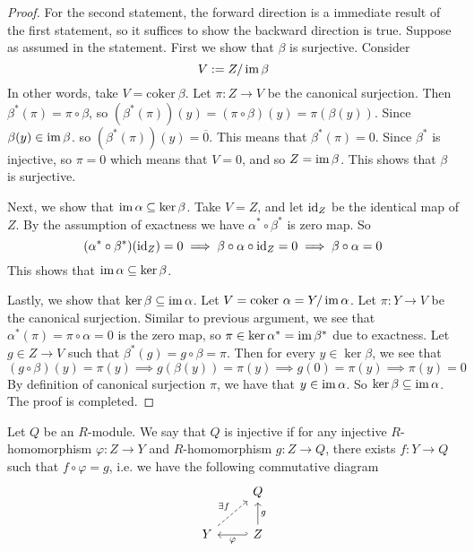 \begin{proof}
    For the second statement, the forward direction is a immediate result of the first statement, so it suffices to show the backward direction is true. Suppose as assumed in the statement. First we show that $\beta$ is surjective. Consider 
    \[V := Z/\operatorname{im} \beta\]
    In other words, take $V= \text{coker}\ \beta$. Let $\pi:Z\to V$ be the canonical surjection. Then $\beta^*(\pi) = \pi\circ \beta$, so $(\beta^*(\pi))(y) = (\pi\circ \beta)(y) = \pi(\beta(y))$. Since $\beta(y)\in \operatorname{im} \beta$. so $(\beta^*(\pi))(y) = \overline{0}$. This means that $\beta^*(\pi)=0$. Since $\beta^*$ is injective, so $\pi=0$ which means that $V=0$, and so $Z = \operatorname{im} \beta$. This shows that $\beta$ is surjective.
    
    Next, we show that $\operatorname{im}\alpha \subseteq \ker \beta$. Take $V=Z$, and let $\operatorname{id}_Z$ be the identical map of $Z$. By the assumption of exactness we have $\alpha^*\circ \beta^*$ is zero map. So
    \[(\alpha^* \circ \beta^*)(\operatorname{id}_Z) = 0 \implies \beta\circ \alpha \circ \operatorname{id}_Z = 0\implies \beta\circ \alpha = 0\]
    This shows that $\operatorname{im} \alpha\subseteq \ker \beta$.

    Lastly, we show that $\ker\beta\subseteq \operatorname{im} \alpha$. Let $V=\text{coker}\ \alpha = Y/\im\alpha$. Let $\pi:Y\to V$ be the canonical surjection. Similar to previous argument, we see that $\alpha^*(\pi) = \pi \circ \alpha = 0$ is the zero map, so $\pi \in \ker \alpha^* = \operatorname{im} \beta^*$ due to exactness. Let $g\in Z\to V$ such that $\beta^*(g) = g\circ \beta=\pi$. Then for every $y\in \ker \beta$, we see that
    \[(g\circ \beta)(y) = \pi(y) \implies g(\beta(y)) = \pi(y) \implies g(0) = \pi(y) \implies \pi(y) = 0\]
    By definition of canonical surjection $\pi$, we have that $y\in \operatorname{im} \alpha$. So $\ker \beta \subseteq \operatorname{im} \alpha$. The proof is completed.
\end{proof}

\begin{defn} 
    Let $Q$ be an $R$-module. We say that $Q$ is injective if for any injective $R$-homomorphism $\varphi:Z\to Y$ and $R$-homomorphism $g:Z\to Q$, there exists $f:Y\to Q$ such that $f\circ \varphi = g$, i.e. we have the following commutative diagram
    \[\begin{tikzcd} [sep = small]
	&& Q \\
	\\
	Y && Z
	\arrow["{\exists f}", dashed, from=3-1, to=1-3]
	\arrow["g"', from=3-3, to=1-3]
	\arrow["\varphi", hook', from=3-3, to=3-1]
    \end{tikzcd}\]
\end{defn}

